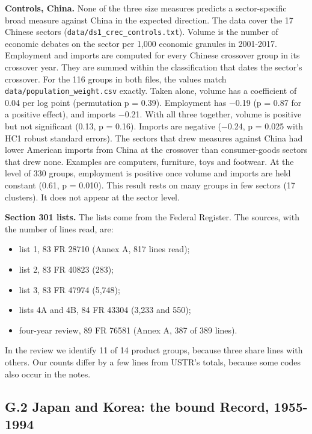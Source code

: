 \textbf{Controls, China.} None of the three size measures predicts a
sector-specific broad measure against China in the expected direction.
The data cover the 17 Chinese sectors
(\texttt{data/\allowbreak{}ds1\_\allowbreak{}crec\_\allowbreak{}controls.txt}). Volume is the number of
economic debates on the sector per 1,000 economic granules in 2001-2017.
Employment and imports are computed for every Chinese crossover group in
its crossover year. They are summed within the classification that dates
the sector's crossover. For the 116 groups in both files, the values
match \texttt{data/\allowbreak{}population\_\allowbreak{}weight.csv} exactly. Taken alone, volume
has a coefficient of 0.04 per log point (permutation p = 0.39).
Employment has −0.19 (p = 0.87 for a positive effect), and imports
−0.21. With all three together, volume is positive but not significant
(0.13, p = 0.16). Imports are negative (−0.24, p = 0.025 with HC1 robust
standard errors). The sectors that drew measures against China had lower
American imports from China at the crossover than consumer-goods sectors
that drew none. Examples are computers, furniture, toys and footwear. At
the level of 330 groups, employment is positive once volume and imports
are held constant (0.61, p = 0.010). This result rests on many groups in
few sectors (17 clusters). It does not appear at the sector level.

\textbf{Section 301 lists.} The lists come from the Federal Register.
The sources, with the number of lines read, are:

\begin{itemize}
\tightlist
\item
  list 1, 83 FR 28710 (Annex A, 817 lines read);
\item
  list 2, 83 FR 40823 (283);
\item
  list 3, 83 FR 47974 (5,748);
\item
  lists 4A and 4B, 84 FR 43304 (3,233 and 550);
\item
  four-year review, 89 FR 76581 (Annex A, 387 of 389 lines).
\end{itemize}

In the review we identify 11 of 14 product groups, because three share
lines with others. Our counts differ by a few lines from USTR's totals,
because some codes also occur in the notes.

\hypertarget{g.2-japan-and-korea-the-bound-record-1955-1994}{%
\subsection*{G.2 Japan and Korea: the bound Record,
1955-1994}\label{g.2-japan-and-korea-the-bound-record-1955-1994}}

